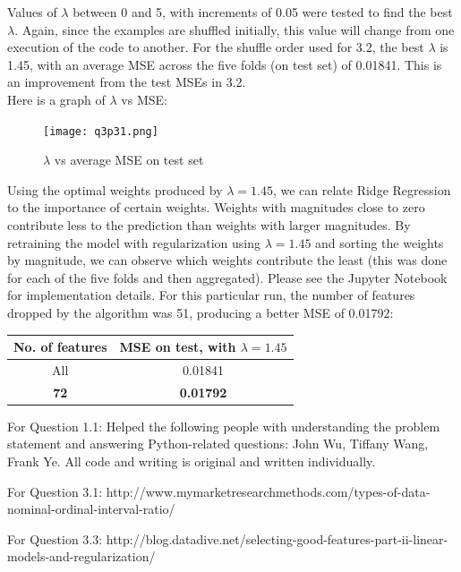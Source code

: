\documentclass[paper=a4, fontsize=11pt]{scrartcl} %
\numberwithin{equation}{section} %
\numberwithin{figure}{section} %
\numberwithin{table}{section} %
\begin{document}
Values of \(\lambda\) between 0 and 5, with increments of 0.05 were tested to find the best \(\lambda\). Again, since the examples are shuffled initially, this value will change from one execution of the code to another. For the shuffle order used for 3.2, the best \(\lambda\) is 1.45, with an average MSE across the five folds (on test set) of 0.01841. This is an improvement from the test MSEs in 3.2. \\

Here is a graph of \(\lambda\) vs MSE:
\begin{figure}[H]
    \texttt{[image: q3p31.png]}
    \caption{\(\lambda\) vs average MSE on test set}
    \label{fig:q3p31}
\end{figure}

Using the optimal weights produced by \(\lambda = 1.45\), we can relate Ridge Regression to the importance of certain weights. Weights with magnitudes close to zero contribute less to the prediction than weights with larger magnitudes. By retraining the model with regularization using \(\lambda = 1.45\) and sorting the weights by magnitude, we can observe which weights contribute the least (this was done for each of the five folds and then aggregated). Please see the Jupyter Notebook for implementation details. For this particular run, the number of features dropped by the algorithm was 51, producing a better MSE of 0.01792:

\begin{center}
\begin{tabular}{ |c|c| }
	\hline
	\textbf{No. of features} & \textbf{MSE on test, with \(\lambda = 1.45\)} \\
	\hline
    All & 0.01841 \\
	\textbf{72} &  \textbf{0.01792} \\
	\hline
\end{tabular}
\end{center}

\newpage

\begin{thebibliography}{9}
For Question 1.1: Helped the following people with understanding the problem statement and answering Python-related questions: John Wu, Tiffany Wang, Frank Ye. All code and writing is original and written individually.

For Question 3.1: http://www.mymarketresearchmethods.com/types-of-data-nominal-ordinal-interval-ratio/

For Question 3.3: http://blog.datadive.net/selecting-good-features-part-ii-linear-models-and-regularization/
\end{thebibliography}
\end{document}

